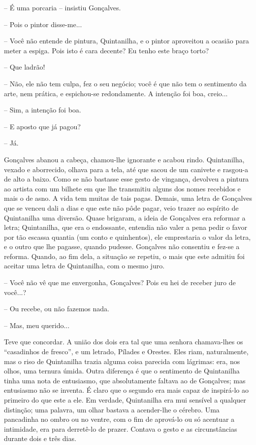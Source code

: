-- É uma porcaria -- insistiu Gonçalves.

-- Pois o pintor disse-me...

-- Você não entende de pintura, Quintanilha, e o pintor aproveitou a
ocasião para meter a espiga. Pois isto é cara decente? Eu tenho este
braço torto?

-- Que ladrão!

-- Não, ele não tem culpa, fez o seu negócio; você é que não tem o
sentimento da arte, nem prática, e espichou-se redondamente. A intenção
foi boa, creio...

-- Sim, a intenção foi boa.

-- E aposto que já pagou?

-- Já.

Gonçalves abanou a cabeça, chamou-lhe ignorante e acabou rindo.
Quintanilha, vexado e aborrecido, olhava para a tela, até que sacou de
um canivete e rasgou-a de alto a baixo. Como se não bastasse esse gesto
de vingança, devolveu a pintura ao artista com um bilhete em que lhe
transmitiu alguns dos nomes recebidos e mais o de asno. A vida tem
muitas de tais pagas. Demais, uma letra de Gonçalves que se venceu dali
a dias e que este não pôde pagar, veio trazer ao espírito de Quintanilha
uma diversão. Quase brigaram, a ideia de Gonçalves era reformar a letra;
Quintanilha, que era o endossante, entendia não valer a pena pedir o
favor por tão escassa quantia (um conto e quinhentos), ele emprestaria o
valor da letra, e o outro que lhe pagasse, quando pudesse. Gonçalves não
consentiu e fez-se a reforma. Quando, ao fim dela, a situação se
repetiu, o mais que este admitiu foi aceitar uma letra de Quintanilha,
com o mesmo juro.

-- Você não vê que me envergonha, Gonçalves? Pois eu hei de receber juro
de você...?

-- Ou recebe, ou não fazemos nada.

-- Mas, meu querido...

Teve que concordar. A união dos dois era tal que uma senhora
chamava-lhes os ``casadinhos de fresco'', e um letrado, Pílades e
Orestes. Eles riam, naturalmente, mas o riso de Quintanilha trazia
alguma coisa parecida com lágrimas: era, nos olhos, uma ternura úmida.
Outra diferença é que o sentimento de Quintanilha tinha uma nota de
entusiasmo, que absolutamente faltava ao de Gonçalves; mas entusiasmo
não se inventa. É claro que o segundo era mais capaz de inspirá-lo ao
primeiro do que este a ele. Em verdade, Quintanilha era mui sensível a
qualquer distinção; uma palavra, um olhar bastava a acender-lhe o
cérebro. Uma pancadinha no ombro ou no ventre, com o fim de aprová-lo ou
só acentuar a intimidade, era para derretê-lo de prazer. Contava o gesto
e as circunstâncias durante dois e três dias.

